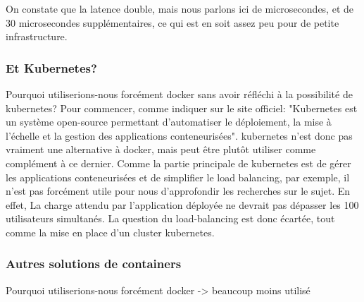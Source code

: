 \documentclass[
    iai, %
    il, %
]{heig-tb}
\begin{document}
On constate que la latence double, mais nous parlons ici de microsecondes, et de 30 microsecondes supplémentaires, ce qui est en soit assez peu pour de petite infrastructure.




\subsubsection{Et Kubernetes?}
Pourquoi utiliserions-nous forcément \Gls{docker} sans avoir réfléchi à la possibilité de \Gls{kubernetes}?
Pour commencer, comme indiquer sur le site officiel:
"Kubernetes est un système open-source permettant d'automatiser le déploiement, la mise à l'échelle et la gestion des applications conteneurisées".
\Gls{kubernetes} n'est donc pas vraiment une alternative à \Gls{docker}, mais peut être plutôt utiliser comme complément à ce dernier.
Comme la partie principale de \Gls{kubernetes} est de gérer les applications conteneurisées et de simplifier le load balancing, par exemple, il n'est pas forcément utile pour nous d'approfondir les recherches sur le sujet.
En effet, La charge attendu par l'application déployée ne devrait pas dépasser les 100 utilisateurs simultanés. La question du load-balancing est donc écartée, tout comme la mise en place d'un cluster \Gls{kubernetes}.




\subsubsection{Autres solutions de containers}
Pourquoi utiliserions-nous forcément \Gls{docker}
-> beaucoup moins utilisé
\end{document}
